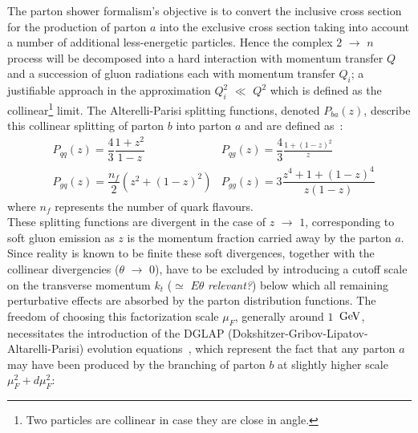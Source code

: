 The parton shower formalism's objective is to convert the inclusive cross section for the production of parton $a$ into the exclusive cross section taking into account a number of additional less-energetic particles.
Hence the complex $2$ $\rightarrow$ $n$ process will be decomposed into a hard interaction with momentum transfer $Q$ and a succession of gluon radiations each with momentum transfer $Q_{i}$; a justifiable approach in the approximation $Q_{i}^{2}$ $\ll$ $Q^2$ which is defined as the collinear\footnote{Two particles are collinear in case they are close in angle.} limit. 
The Alterelli-Parisi splitting functions, denoted $P_{ba}(z)$, describe this collinear splitting of parton $b$ into parton $a$ and are defined as~\cite{}:
\begin{eqnarray}
 & P_{qq}(z) = \dfrac{4}{3} \dfrac{1+z^{2}}{1-z}    & P_{qg}(z) = \dfrac{4}{3} \frac{1+(1-z)^{2}}{z} \\
 & P_{gq}(z) = \dfrac{n_{f}}{2} (z^{2} + (1-z)^{2}) & P_{gg}(z) = 3 \dfrac{z^{4}+1+(1-z)^{4}}{z(1-z)}
\end{eqnarray}
where $n_{f}$ represents the number of quark flavours.
\\
These splitting functions are divergent in the case of $z$ $\rightarrow$ $1$, corresponding to soft gluon emission as $z$ is the momentum fraction carried away by the parton $a$. 
Since reality is known to be finite these soft divergences, together with the collinear divergencies ($\theta$ $\rightarrow$ $0$), have to be excluded by introducing a cutoff scale on the transverse momentum $k_{t}$ ($\simeq$ $E\theta$ \textit{relevant?}) below which all remaining perturbative effects are absorbed by the parton distribution functions. 
The freedom of choosing this factorization scale $\mu_{F}$, generally around $1$ $\, \mathrm{GeV}$, necessitates the introduction of the DGLAP (Dokshitzer-Gribov-Lipatov-Altarelli-Parisi) evolution equations~\cite{}, which represent the fact that any parton $a$ may have been produced by the branching of parton $b$ at slightly higher scale $\mu_{F}^2 + d\mu_{F}^2$:\\
